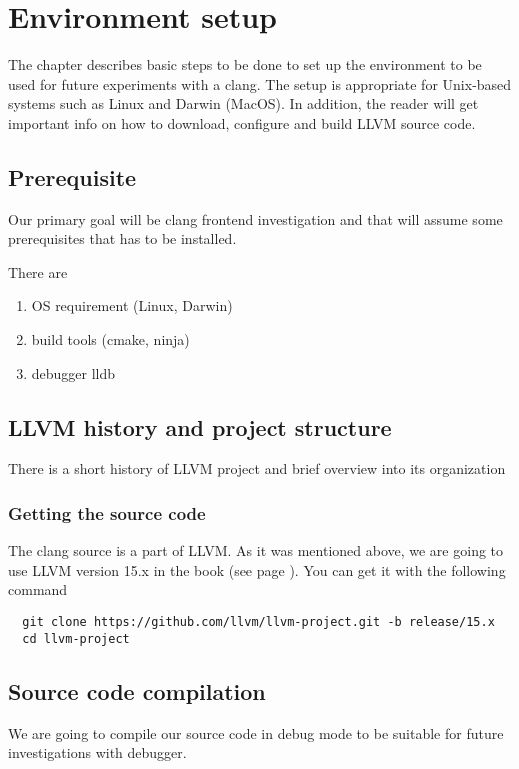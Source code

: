 \chapter{Environment setup}
The chapter describes basic steps to be done to set up the environment to be
used for future experiments with a clang. The setup is appropriate for
Unix-based systems such as Linux and Darwin (MacOS). In addition, the reader
will get important info on how to download, configure and build LLVM source
code.  


\section{Prerequisite}
Our primary goal will be clang frontend investigation and that will assume some
prerequisites that has to be installed.

There are
\begin{enumerate}
\item OS requirement (Linux, Darwin)
\item build tools (cmake, ninja)
\item debugger lldb
\end{enumerate}

\section{LLVM history and project structure}

There is a short history of LLVM project and brief overview into its
organization 

\subsection{Getting the source code}

The clang source is a part of LLVM. As it was mentioned above, we are going to
use LLVM version 15.x in the book (see page \pageref{c:release15}). You can get it with the following command
\begin{verbatim}
  git clone https://github.com/llvm/llvm-project.git -b release/15.x
  cd llvm-project
\end{verbatim}

\section{Source code compilation}

We are going to compile our source code in debug mode to be suitable
for future investigations with debugger.

